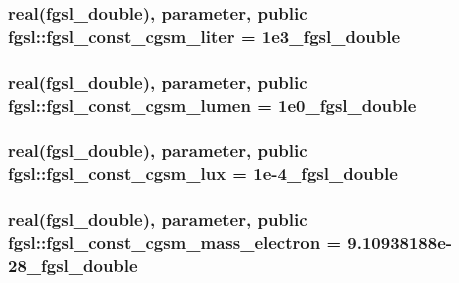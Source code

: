 \subsubsection[{fgsl\+\_\+const\+\_\+cgsm\+\_\+liter}]{\setlength{\rightskip}{0pt plus 5cm}real({\bf fgsl\+\_\+double}), parameter, public fgsl\+::fgsl\+\_\+const\+\_\+cgsm\+\_\+liter = 1e3\+\_\+fgsl\+\_\+double}\label{namespacefgsl_aa765c28c4966a92d631fc0d4721e7160}
\hypertarget{namespacefgsl_a754f063aac1363ab86693605311aeaf8}{}
\subsubsection[{fgsl\+\_\+const\+\_\+cgsm\+\_\+lumen}]{\setlength{\rightskip}{0pt plus 5cm}real({\bf fgsl\+\_\+double}), parameter, public fgsl\+::fgsl\+\_\+const\+\_\+cgsm\+\_\+lumen = 1e0\+\_\+fgsl\+\_\+double}\label{namespacefgsl_a754f063aac1363ab86693605311aeaf8}
\hypertarget{namespacefgsl_aba54a122b0e64f01ac54513a4a0f6a9f}{}
\subsubsection[{fgsl\+\_\+const\+\_\+cgsm\+\_\+lux}]{\setlength{\rightskip}{0pt plus 5cm}real({\bf fgsl\+\_\+double}), parameter, public fgsl\+::fgsl\+\_\+const\+\_\+cgsm\+\_\+lux = 1e-\/4\+\_\+fgsl\+\_\+double}\label{namespacefgsl_aba54a122b0e64f01ac54513a4a0f6a9f}
\hypertarget{namespacefgsl_a8b5c993b964f03b76098558c24095fd4}{}
\subsubsection[{fgsl\+\_\+const\+\_\+cgsm\+\_\+mass\+\_\+electron}]{\setlength{\rightskip}{0pt plus 5cm}real({\bf fgsl\+\_\+double}), parameter, public fgsl\+::fgsl\+\_\+const\+\_\+cgsm\+\_\+mass\+\_\+electron = 9.\+10938188e-\/28\+\_\+fgsl\+\_\+double}\label{namespacefgsl_a8b5c993b964f03b76098558c24095fd4}
\hypertarget{namespacefgsl_a3092e1888259499b77e1dc358db86c58}{}
